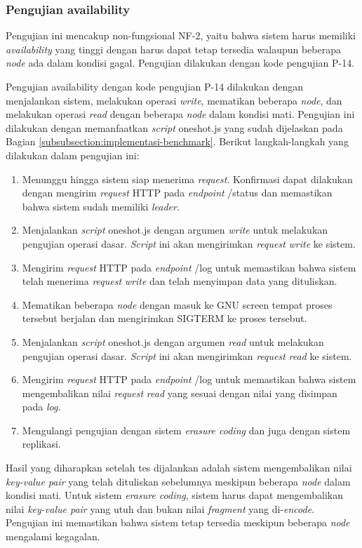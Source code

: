 \subsubsection{Pengujian availability}
\label{subsubsection:pengujian-availability}

Pengujian ini mencakup non-fungsional NF-2, yaitu bahwa sistem harus memiliki \textit{availability} yang tinggi dengan harus dapat tetap tersedia walaupun beberapa \textit{node} ada dalam kondisi gagal. Pengujian dilakukan dengan kode pengujian P-14.

Pengujian availability dengan kode pengujian P-14 dilakukan dengan menjalankan sistem, melakukan operasi \textit{write}, mematikan beberapa \textit{node}, dan melakukan operasi \textit{read} dengan beberapa \textit{node} dalam kondisi mati. Pengujian ini dilakukan dengan memanfaatkan \textit{script} oneshot.js yang sudah dijelaskan pada Bagian \ref{subsubsection:implementasi-benchmark}. Berikut langkah-langkah yang dilakukan dalam pengujian ini:

\begin{enumerate}
	\item Menunggu hingga sistem siap menerima \textit{request}. Konfirmasi dapat dilakukan dengan mengirim \textit{request} HTTP pada \textit{endpoint} /status dan memastikan bahwa sistem sudah memiliki \textit{leader}.
	\item Menjalankan \textit{script} oneshot.js dengan argumen \textit{write} untuk melakukan pengujian operasi dasar. \textit{Script} ini akan mengirimkan \textit{request} \textit{write} ke sistem.
	\item Mengirim \textit{request} HTTP pada \textit{endpoint} /log untuk memastikan bahwa sistem telah menerima \textit{request} \textit{write} dan telah menyimpan data yang dituliskan.
	\item Mematikan beberapa \textit{node} dengan masuk ke GNU screen tempat proses tersebut berjalan dan mengirimkan SIGTERM ke proses tersebut.
	\item Menjalankan \textit{script} oneshot.js dengan argumen \textit{read} untuk melakukan pengujian operasi dasar. \textit{Script} ini akan mengirimkan \textit{request} \textit{read} ke sistem.
	\item Mengirim \textit{request} HTTP pada \textit{endpoint} /log untuk memastikan bahwa sistem mengembalikan nilai \textit{request} \textit{read} yang sesuai dengan nilai yang disimpan pada \textit{log}.
	\item Mengulangi pengujian dengan sistem \textit{erasure coding} dan juga dengan sistem replikasi.
\end{enumerate}

Hasil yang diharapkan setelah tes dijalankan adalah sistem mengembalikan nilai \textit{key-value pair} yang telah dituliskan sebelumnya meskipun beberapa \textit{node} dalam kondisi mati. Untuk sistem \textit{erasure coding}, sistem harus dapat mengembalikan nilai \textit{key-value pair} yang utuh dan bukan nilai \textit{fragment} yang di-\textit{encode}. Pengujian ini memastikan bahwa sistem tetap tersedia meskipun beberapa \textit{node} mengalami kegagalan.